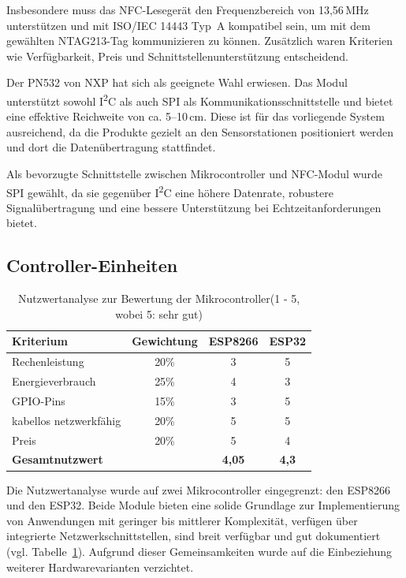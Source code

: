 Insbesondere muss das NFC-Lesegerät den Frequenzbereich von 13{,}56\,MHz unterstützen und mit ISO/IEC 14443 Typ~A kompatibel sein, um mit dem gewählten NTAG213-Tag kommunizieren zu können. Zusätzlich waren Kriterien wie Verfügbarkeit, Preis und Schnittstellenunterstützung entscheidend.

Der PN532 von NXP hat sich als geeignete Wahl erwiesen. Das Modul unterstützt sowohl I\textsuperscript{2}C als auch SPI als Kommunikationsschnittstelle und bietet eine effektive Reichweite von ca. 5–10\,cm. Diese ist für das vorliegende System ausreichend, da die Produkte gezielt an den Sensorstationen positioniert werden und dort die Datenübertragung stattfindet.

Als bevorzugte Schnittstelle zwischen Mikrocontroller und NFC-Modul wurde SPI gewählt, da sie gegenüber I\textsuperscript{2}C eine höhere Datenrate, robustere Signalübertragung und eine bessere Unterstützung bei Echtzeitanforderungen bietet.


\subsection{Controller-Einheiten}

\begin{table}[H]
	\centering
	\caption{Nutzwertanalyse zur Bewertung der Mikrocontroller(1 - 5, wobei 5: sehr gut)}
	\label{tab:nwa_ctrl}
	\begin{tabular}{|l|c|c|c|}
		\hline
		\textbf{Kriterium} & \textbf{Gewichtung} & \textbf{ESP8266} & \textbf{ESP32} \\ \hline
		Rechenleistung          & 20\% & 3 & 5 			\\ \hline
		Energieverbrauch        & 25\% & 4 & 3 		\\ \hline \hline
 		GPIO-Pins                     & 15\% & 3 & 5      \\ \hline
		kabellos netzwerkfähig	& 20\% & 5 & 5 	\\ \hline
		Preis                   & 20\% & 5 & 4 \\ \hline
		\textbf{Gesamtnutzwert} &       & \textbf{4,05} & \textbf{4,3} \\ \hline
	\end{tabular}
\end{table}

Die Nutzwertanalyse wurde auf zwei Mikrocontroller eingegrenzt: den ESP8266 und den ESP32. Beide Module bieten eine solide Grundlage zur Implementierung von Anwendungen mit geringer bis mittlerer Komplexität, verfügen über integrierte Netzwerkschnittstellen, sind breit verfügbar und gut dokumentiert (vgl. Tabelle~\ref{tab:nwa_ctrl}). Aufgrund dieser Gemeinsamkeiten wurde auf die Einbeziehung weiterer Hardwarevarianten verzichtet.

